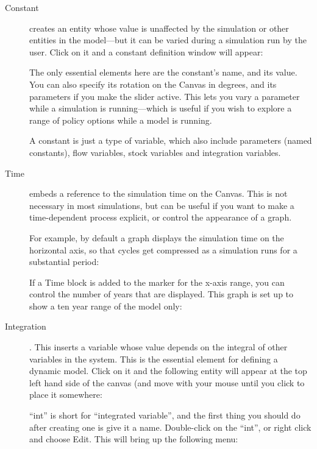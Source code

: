 \begin{description}
\item[Constant]  \label{Constant} creates an entity whose
value is unaffected by the simulation or other entities in the
model---but it can be varied during a simulation run by the
user. Click on it and a constant definition window will appear:



The only essential elements here are the constant's name, and its
value. You can also specify its rotation on the Canvas in degrees, and
its parameters if you make the slider active. This lets you vary a
parameter while a simulation is running---which is useful if you wish
to explore a range of policy options while a model is running.

A constant is just a type of variable, which also include parameters
(named constants), flow variables, stock variables and integration variables.

\item[Time]  embeds a reference to the
simulation time on the Canvas. This is not necessary in most
simulations, but can be useful if you want to make a time-dependent
process explicit, or control the appearance of a graph. 

For example, by default a graph displays the simulation time on the
horizontal axis, so that cycles get compressed as a simulation runs
for a substantial period:


If a Time block is added to the marker for the x-axis range, you can
control the number of years that are displayed. This graph is set up
to show a ten year range of the model only: 




\item[Integration] .\label{Integrate}
  This inserts a variable whose value depends on the integral of other
  variables in the system. This is the essential element for defining
  a dynamic model. Click on it and the following entity will appear at
  the top left hand side of the canvas (and move with your mouse until
  you click to place it somewhere:



``int'' is short for ``integrated variable'', and the first thing you should do after creating one is give it a name. Double-click on the ``int'', or right click and choose Edit. This will bring up the following menu:


\end{description}
